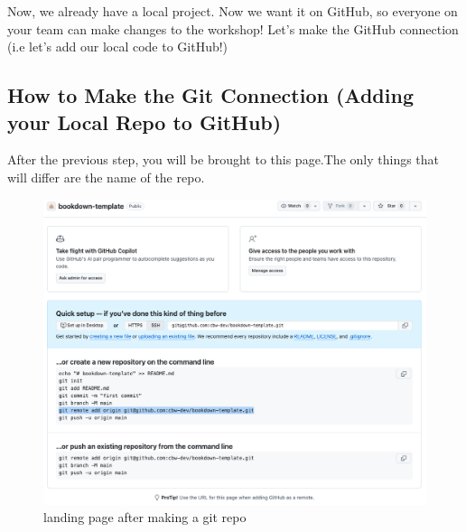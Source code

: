 \documentclass[
]{book}
\theoremstyle{definition}
\theoremstyle{definition}
\theoremstyle{definition}
\theoremstyle{definition}
\theoremstyle{remark}
\begin{document}
Now, we already have a local project. Now we want it on GitHub, so everyone on your team can make changes to the workshop! Let's make the GitHub connection (i.e let's add our local code to GitHub!)

\subsection{How to Make the Git Connection (Adding your Local Repo to GitHub)}\label{how-to-make-the-git-connection-adding-your-local-repo-to-github}

After the previous step, you will be brought to this page.The only things that will differ are the name of the repo.

\begin{figure}
\centering
\includegraphics{img/git-instruct/git-connection.png}
\caption{landing page after making a git repo}
\end{figure}
\end{document}
